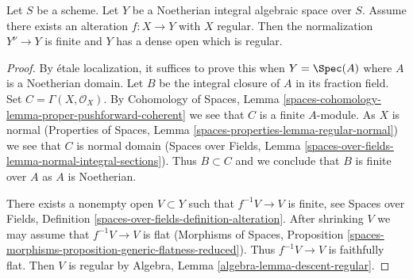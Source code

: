\begin{lemma}
\label{lemma-regular-alteration-implies}
Let $S$ be a scheme. Let $Y$ be a Noetherian integral algebraic space
over $S$. Assume there exists an alteration
$f : X \to Y$ with $X$ regular. Then the normalization $Y^\nu \to Y$
is finite and $Y$ has a dense open which is regular.
\end{lemma}

\begin{proof}
By \'etale localization, it suffices to prove this when
$Y = \Spec(A)$ where $A$ is a Noetherian domain.
Let $B$ be the integral closure of $A$ in its fraction field.
Set $C = \Gamma(X, \mathcal{O}_X)$. By
Cohomology of Spaces, Lemma
\ref{spaces-cohomology-lemma-proper-pushforward-coherent}
we see that $C$ is a finite $A$-module.
As $X$ is normal
(Properties of Spaces, Lemma
\ref{spaces-properties-lemma-regular-normal})
we see that $C$ is normal domain
(Spaces over Fields, Lemma
\ref{spaces-over-fields-lemma-normal-integral-sections}).
Thus $B \subset C$ and we conclude that $B$ is finite over $A$
as $A$ is Noetherian.

\medskip\noindent
There exists a nonempty open $V \subset Y$ such that $f^{-1}V \to V$
is finite, see Spaces over Fields, Definition
\ref{spaces-over-fields-definition-alteration}.
After shrinking $V$ we may assume that $f^{-1}V \to V$ is flat
(Morphisms of Spaces, Proposition
\ref{spaces-morphisms-proposition-generic-flatness-reduced}).
Thus $f^{-1}V \to V$ is faithfully flat. Then $V$ is regular by
Algebra, Lemma \ref{algebra-lemma-descent-regular}.
\end{proof}
